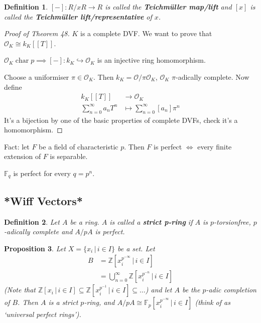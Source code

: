 \documentclass[a4paper]{article}
\newtheorem{definition}{Definition}
\newtheorem{prop}[definition]{Proposition}
\DeclareMathOperator{\characteristic}{char}
\begin{document}
\begin{definition}
	$[-]:R/xR \to R$ is called the \textbf{Teichm\"uller map/lift}
	and $[x]$ is called the \textbf{Teichm\"uller lift/representative} of $x$.
\end{definition}
\begin{proof}[Proof of Theorem 48]
	$K$ is a complete DVF.
	We want to prove that $\mathcal{O}_K \cong k_K[[T]]$.
	
	$\mathcal{O}_K \characteristic p \implies [-]:k_K \hookrightarrow \mathcal{O}_K$ is an injective ring homomorphism.
	
	Choose a uniformiser $\pi \in \mathcal{O}_K$. Then
	$k_K = \mathcal{O}/\pi\mathcal{O}_K$, $\mathcal{O}_K$ $\pi$-adically complete.
	Now define
	\begin{align*}
		k_K[[T]] &\to \mathcal{O}_K \\
		\sum_{n=0}^\infty a_n T^n &\mapsto \sum_{n=0}^\infty [a_n] \pi^n
	\end{align*}
	It's a bijection by one of the basic properties of complete DVFs, check it's a homomorphism.
\end{proof}

Fact: let $F$ be a field of characteristic $p$. Then $F$ is perfect $\iff$ every finite extension of $F$ is separable.

$\mathbb{F}_q$ is perfect for every $q=p^n$.

\subsection{*Wiff Vectors*}

\begin{definition}
	Let $A$ be a ring. $A$ is called a \textbf{strict p-ring} if $A$ is $p$-torsionfree,
	$p$-adically complete and $A/pA$ is perfect.
\end{definition}

\begin{prop}
	Let $X = \{x_i \,|\, i \in I\}$ be a set.
	Let
	\begin{align*}
	B &= \mathbb{Z}[x_i^{p^{-\infty}} \,|\, i \in I]\\
	&= \bigcup_{n=0}^\infty \mathbb{Z}[x_i^{p^{-n}} \,|\, i \in I]
	\end{align*}
	(Note that $\mathbb{Z}[x_i \,|\, i \in I] \subseteq \mathbb{Z}[x_i^{p^{-1}} \,|\, i \in I] \subseteq \dots$)
	and let $A$ be the $p$-adic completion of $B$. Then $A$ is a strict $p$-ring,
	and $A/pA \cong \mathbb{F}_p[x_i^{p^{-\infty}} \,|\, i \in I]$ (think of as `universal perfect rings').
\end{prop}
\end{document}
